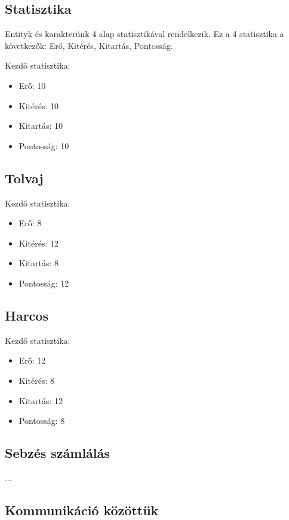 \subsection{Statisztika}

Entityk és karakterünk 4 alap statisztikával rendelkezik.
Ez a 4 statisztika a következők: Erő, Kitérés, Kitartás, Pontosság.

Kezdő statisztika:
\begin{itemize}
    \item Erő: 10
    \item Kitérés: 10
    \item Kitartás: 10
    \item Pontosság: 10
\end{itemize}


\subsection{Tolvaj}

Kezdő statisztika:
\begin{itemize}
    \item Erő: 8
    \item Kitérés: 12
    \item Kitartás: 8
    \item Pontosság: 12
\end{itemize}

\subsection{Harcos}

Kezdő statisztika:
\begin{itemize}
    \item Erő: 12
    \item Kitérés: 8
    \item Kitartás: 12
    \item Pontosság: 8
\end{itemize}

\subsection{Sebzés számlálás}

...

\subsection{Kommunikáció közöttük}

